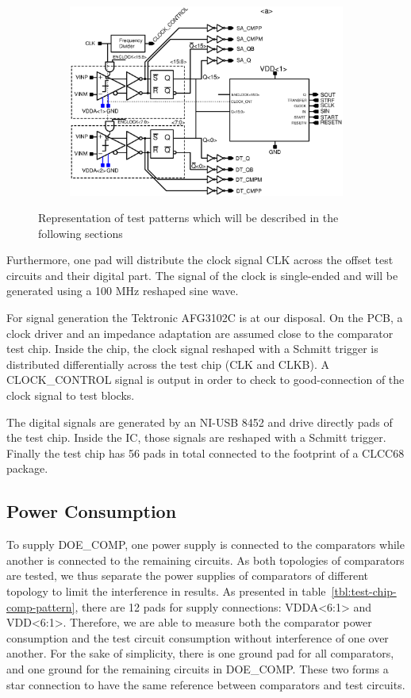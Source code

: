 \begin{figure}[htp]
\begin{subfigure}[b]{0.75\textwidth}
        \includegraphics[width=\textwidth]{Chapter5/Figs/comp_test/test_offset_conv_bloc.ps}
    \end{subfigure}
    \caption{Representation of test patterns which will be described in the following sections}
    \label{fig:test-chip-comp-patterns}
\end{figure}

Furthermore, one pad will distribute the clock signal CLK across the offset test circuits and their digital part. The signal of the clock is single-ended and will be generated using a 100 MHz reshaped sine wave.

For signal generation the Tektronic AFG3102C is at our disposal. On the PCB, a clock driver and an impedance adaptation are assumed close to the comparator test chip. Inside the chip, the clock signal reshaped with a Schmitt trigger is distributed differentially across the test chip (CLK and CLKB). A CLOCK\_CONTROL signal is output in order to check to good-connection of the clock signal to test blocks.

The digital signals are generated by an NI-USB 8452 and drive directly pads of the test chip. Inside the IC, those signals are reshaped with a Schmitt trigger. Finally the test chip has 56 pads in total connected to the footprint of a CLCC68 package.

\subsection{Power Consumption}
To supply DOE\_COMP, one power supply is connected to the comparators while another is connected to the remaining circuits.
As both topologies of comparators are tested, we thus separate the power supplies of comparators of different topology to limit the interference in results. As presented in table~\ref{tbl:test-chip-comp-pattern}, there are 12 pads for supply connections: VDDA<6:1> and VDD<6:1>. Therefore, we are able to measure both the comparator power consumption and the test circuit consumption without interference of one over another. For the sake of simplicity, there is one ground pad for all comparators, and one ground for the remaining circuits in DOE\_COMP. These two forms a star connection to have the same reference between comparators and test circuits.

